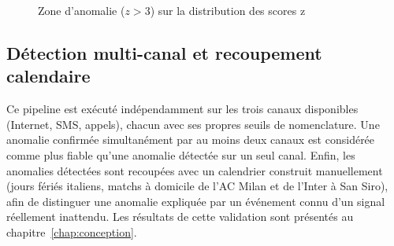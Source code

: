 \begin{figure}[htbp]
  \centering
  \caption{Zone d'anomalie ($z > 3$) sur la distribution des scores z}
  \label{fig:zscore}
\end{figure}

\subsection{Détection multi-canal et recoupement calendaire}
\label{sec:multicanal-methodo}

Ce pipeline est exécuté indépendamment sur les trois canaux
disponibles (Internet, SMS, appels), chacun avec ses propres seuils
de nomenclature. Une anomalie confirmée simultanément par au moins
deux canaux est considérée comme plus fiable qu'une anomalie détectée
sur un seul canal. Enfin, les anomalies détectées sont recoupées avec
un calendrier construit manuellement (jours fériés italiens, matchs à
domicile de l'AC Milan et de l'Inter à San Siro), afin de distinguer
une anomalie expliquée par un événement connu d'un signal réellement
inattendu. Les résultats de cette validation sont présentés au
chapitre~\ref{chap:conception}.
